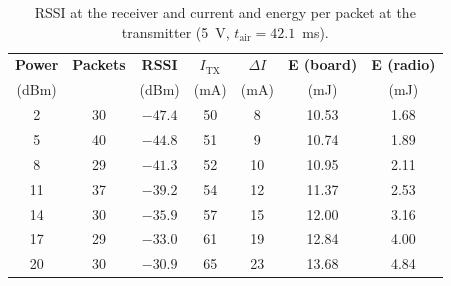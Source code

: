 \documentclass[informe,english]{plantilla}
\begin{document}
\begin{table}[htbp]
    \centering
    \small
    \begin{tabular}{@{}ccccccc@{}}
        \toprule
        \textbf{Power} & \textbf{Packets} & \textbf{RSSI}  &
        $I_{\text{TX}}$ & $\Delta I$ & \textbf{E (board)} & \textbf{E (radio)} \\
        (dBm) & & (dBm)  & (mA) & (mA) & (mJ) & (mJ) \\
        \midrule
        2  & 30 & $-47.4$ & 50 & 8  & 10.53 & 1.68 \\
        5  & 40 & $-44.8$ & 51 & 9  & 10.74 & 1.89 \\
        8  & 29 & $-41.3$ & 52 & 10 & 10.95 & 2.11 \\
        11 & 37 & $-39.2$ & 54 & 12 & 11.37 & 2.53 \\
        14 & 30 & $-35.9$ & 57 & 15 & 12.00 & 3.16 \\
        17 & 29 & $-33.0$ & 61 & 19 & 12.84 & 4.00 \\
        20 & 30 & $-30.9$ & 65 & 23 & 13.68 & 4.84 \\
        \bottomrule
    \end{tabular}
    \caption{RSSI at the receiver and current and energy per packet at the transmitter (5~V, $t_{\text{air}} = 42.1$~ms).}
    \label{tab:txpower}
\end{table}
\end{document}
